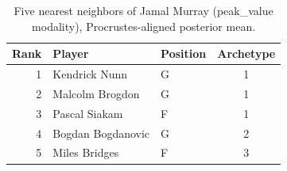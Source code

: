 \begin{table}[htbp]
  \centering\small
  \begin{tabular}{rllc}
    \toprule
    Rank & Player & Position & Archetype \\
    \midrule
    1 & Kendrick Nunn & G & 1 \\
    2 & Malcolm Brogdon & G & 1 \\
    3 & Pascal Siakam & F & 1 \\
    4 & Bogdan Bogdanovic & G & 2 \\
    5 & Miles Bridges & F & 3 \\
    \bottomrule
  \end{tabular}
  \caption{Five nearest neighbors of Jamal Murray (peak_value modality), Procrustes-aligned posterior mean.}
  \label{tab:Jamal_Murray_neighbors_peak_value}
\end{table}

